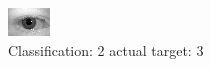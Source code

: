 \begin{figure}[h!]
\begin{center}
\includegraphics[width=0.60\columnwidth]{figures/ID528_class_2_target_3.png}
\end{center}
\caption{ Classification: 2 actual target: 3}
\label{fig:ID528_class_2_target_3}
\end{figure}
